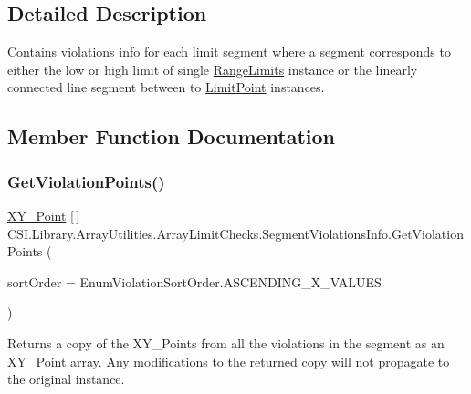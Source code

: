 \subsection{Detailed Description}
Contains violations info for each limit segment where a segment corresponds to either the low or high limit of single \mbox{\hyperlink{class_c_s_i_1_1_library_1_1_array_utilities_1_1_array_limit_checks_1_1_range_limits}{Range\+Limits}} instance or the linearly connected line segment between to \mbox{\hyperlink{class_c_s_i_1_1_library_1_1_array_utilities_1_1_array_limit_checks_1_1_limit_point}{Limit\+Point}} instances. 



\subsection{Member Function Documentation}
\mbox{\label{class_c_s_i_1_1_library_1_1_array_utilities_1_1_array_limit_checks_1_1_segment_violations_info_a68b0f5cb191ec4d9b4c70c0a120b9cfa}} 
\subsubsection{\texorpdfstring{GetViolationPoints()}{GetViolationPoints()}}
{\footnotesize\ttfamily \mbox{\hyperlink{struct_c_s_i_1_1_library_1_1_data_types_1_1_x_y___point}{X\+Y\+\_\+\+Point}} \mbox{[}$\,$\mbox{]} C\+S\+I.\+Library.\+Array\+Utilities.\+Array\+Limit\+Checks.\+Segment\+Violations\+Info.\+Get\+Violation\+Points (\begin{DoxyParamCaption}\item[{Enum\+Violation\+Sort\+Order}]{sort\+Order = {\ttfamily EnumViolationSortOrder.ASCENDING\+\_\+X\+\_\+VALUES} }\end{DoxyParamCaption})\hspace{0.3cm}{\ttfamily [inline]}}



Returns a copy of the X\+Y\+\_\+\+Points from all the violations in the segment as an X\+Y\+\_\+\+Point array. Any modifications to the returned copy will not propagate to the original instance. 

